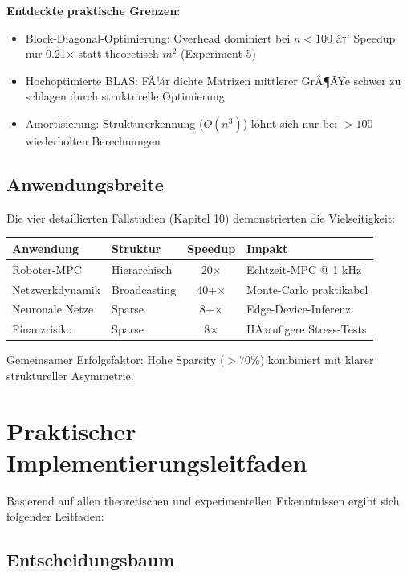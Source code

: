 ﻿\documentclass[a4paper,12pt]{report}
\theoremstyle{definition}
\begin{document}
	\textbf{Entdeckte praktische Grenzen}:
	\begin{itemize}
		\item Block-Diagonal-Optimierung: Overhead dominiert bei $n < 100$ â†’ Speedup nur 0.21$\times$ statt theoretisch $m^2$ (Experiment 5)
		\item Hochoptimierte BLAS: FÃ¼r dichte Matrizen mittlerer GrÃ¶ÃŸe schwer zu schlagen durch strukturelle Optimierung
		\item Amortisierung: Strukturerkennung ($O(n^3)$) lohnt sich nur bei $> 100$ wiederholten Berechnungen
	\end{itemize}
	
	\subsection{Anwendungsbreite}
	
	Die vier detaillierten Fallstudien (Kapitel 10) demonstrierten die Vielseitigkeit:
	
	\begin{center}
		\begin{tabular}{|l|l|c|l|}
			\hline
			\textbf{Anwendung} & \textbf{Struktur} & \textbf{Speedup} & \textbf{Impakt} \\
			\hline
			Roboter-MPC & Hierarchisch & 20$\times$ & Echtzeit-MPC @ 1 kHz \\
			Netzwerkdynamik & Broadcasting & 40+$\times$ & Monte-Carlo praktikabel \\
			Neuronale Netze & Sparse & 8+$\times$ & Edge-Device-Inferenz \\
			Finanzrisiko & Sparse & 8$\times$ & HÃ¤ufigere Stress-Tests \\
			\hline
		\end{tabular}
	\end{center}
	
	Gemeinsamer Erfolgsfaktor: Hohe Sparsity ($> 70\%$) kombiniert mit klarer struktureller Asymmetrie.
	
	\section{Praktischer Implementierungsleitfaden}
	
	Basierend auf allen theoretischen und experimentellen Erkenntnissen ergibt sich folgender Leitfaden:
	
	\subsection{Entscheidungsbaum}
	
\end{document}
